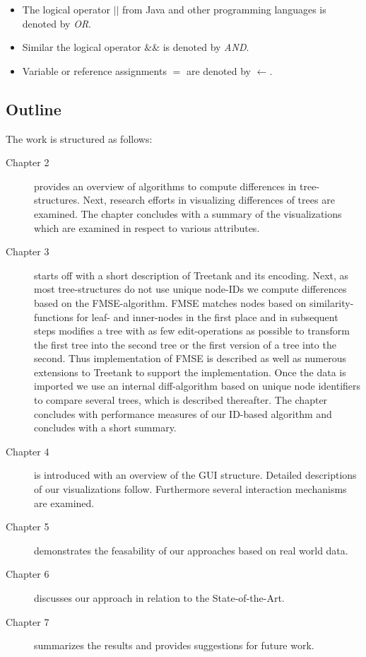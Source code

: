 \begin{itemize}
\item The logical operator \emph{$||$} from Java and other programming languages is denoted by \emph{OR}.
\item Similar the logical operator \emph{$\&\&$} is denoted by \emph{AND}.
\item Variable or reference assignments \emph{$=$} are denoted by \emph{$\leftarrow$}.
\end{itemize}

\subsection{Outline}
The work is structured as follows:

\begin{description}
\item[Chapter 2] provides an overview of algorithms to compute differences in tree-structures. Next, research efforts in visualizing differences of trees are examined. The chapter concludes with a summary of the visualizations which are examined in respect to various attributes.
\item[Chapter 3] starts off with a short description of Treetank and its encoding. Next, as most tree-structures do not use unique node-IDs we compute differences based on the FMSE-algorithm. FMSE matches nodes based on similarity-functions for leaf- and inner-nodes in the first place and in subsequent steps modifies a tree with as few edit-operations as possible to transform the first tree into the second tree or the first version of a tree into the second. Thus implementation of FMSE is described as well as numerous extensions to Treetank to support the implementation. Once the data is imported we use an internal diff-algorithm based on unique node identifiers to compare several trees, which is described thereafter. The chapter concludes with performance measures of our ID-based algorithm and concludes with a short summary.
\item[Chapter 4] is introduced with an overview of the GUI structure. Detailed descriptions of our visualizations follow. Furthermore several interaction mechanisms are examined.
\item[Chapter 5] demonstrates the feasability of our approaches based on real world data.
\item[Chapter 6] discusses our approach in relation to the State-of-the-Art.
\item[Chapter 7] summarizes the results and provides suggestions for future work.
\end{description}


